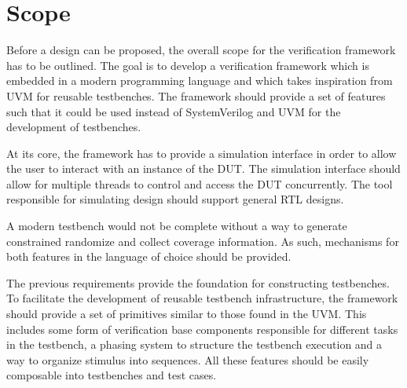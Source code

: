 \section{Scope} %

Before a design can be proposed, the overall scope for the verification framework has to be outlined. The goal is to develop a
verification framework which is embedded in a modern programming language and which takes inspiration from UVM for
reusable testbenches. The framework should provide a set of features such that it could be used instead of
SystemVerilog and UVM for the development of testbenches.

At its core, the framework has to provide a simulation interface in order to allow the user to interact with an
instance of the DUT. The simulation interface should allow for multiple threads to control and access the DUT
concurrently. The tool responsible for simulating design should support general RTL designs.

A modern testbench would not be complete without a way to generate constrained randomize and collect coverage
information. As such, mechanisms for both features in the language of choice should be provided. 

The previous requirements provide the foundation for constructing testbenches. To facilitate the development of
reusable testbench infrastructure, the framework should provide a set of primitives similar to those found in the
UVM. This includes some form of verification base components responsible for different tasks in the testbench, a
phasing system to structure the testbench execution and a way to organize stimulus into sequences. All these features
should be easily composable into testbenches and test cases.




